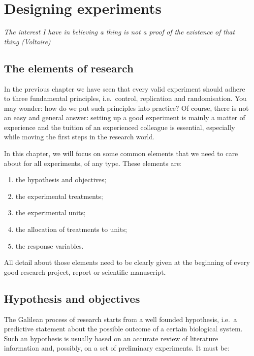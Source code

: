 \documentclass[a4paper,12pt,oneside]{book}
\providecommand{\tightlist}{%
  \setlength{\itemsep}{0pt}\setlength{\parskip}{0pt}}
\begin{document}
\hypertarget{designing-experiments}{%
\chapter{Designing experiments}\label{designing-experiments}}

\emph{The interest I have in believing a thing is not a proof of the existence of that thing (Voltaire)}

\hypertarget{the-elements-of-research}{%
\section{The elements of research}\label{the-elements-of-research}}

In the previous chapter we have seen that every valid experiment should adhere to three fundamental principles, i.e.~control, replication and randomisation. You may wonder: how do we put such principles into practice? Of course, there is not an easy and general answer: setting up a good experiment is mainly a matter of experience and the tuition of an experienced colleague is essential, especially while moving the first steps in the research world.

In this chapter, we will focus on some common elements that we need to care about for all experiments, of any type. These elements are:

\begin{enumerate}
\def\labelenumi{\arabic{enumi}.}
\tightlist
\item
  the hypothesis and objectives;
\item
  the experimental treatments;
\item
  the experimental units;
\item
  the allocation of treatments to units;
\item
  the response variables.
\end{enumerate}

All detail about those elements need to be clearly given at the beginning of every good research project, report or scientific manuscript.

\hypertarget{hypothesis-and-objectives}{%
\section{Hypothesis and objectives}\label{hypothesis-and-objectives}}

The Galilean process of research starts from a well founded hypothesis, i.e.~a predictive statement about the possible outcome of a certain biological system. Such an hypothesis is usually based on an accurate review of literature information and, possibly, on a set of preliminary experiments. It must be:
\end{document}
